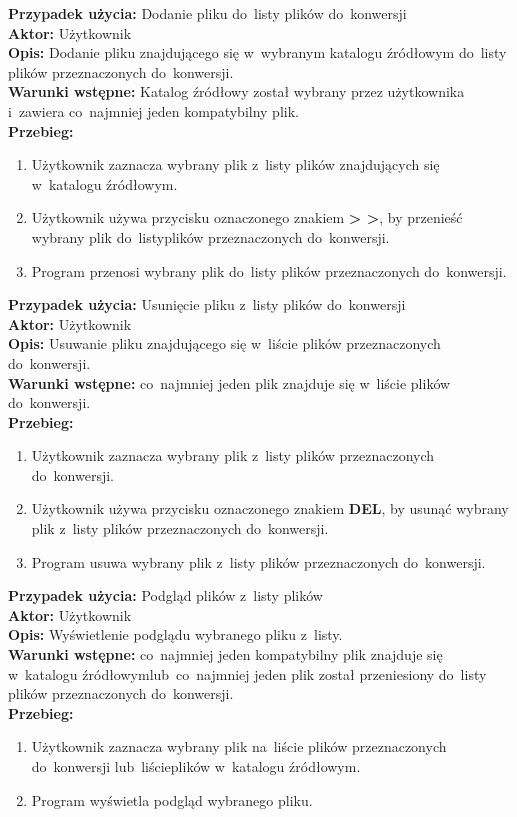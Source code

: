 \noindent \textbf{Przypadek użycia:} Dodanie pliku do~listy plików do~konwersji\\
\textbf{Aktor:} Użytkownik\\
\textbf{Opis:} Dodanie pliku znajdującego się w~wybranym katalogu źródłowym do~listy plików przeznaczonych do~konwersji.\\
\textbf{Warunki wstępne:} Katalog źródłowy został wybrany przez użytkownika i~zawiera co~najmniej jeden kompatybilny plik.\\
\textbf{Przebieg:}
\begin{enumerate}
\item Użytkownik zaznacza wybrany plik z~listy plików znajdujących się w~katalogu źródłowym.
\item Użytkownik używa przycisku oznaczonego znakiem \textbf{> >}, by przenieść wybrany plik do~listy\linebreak plików przeznaczonych do~konwersji.
\item Program przenosi wybrany plik do~listy plików przeznaczonych do~konwersji.
\end{enumerate}


\noindent \textbf{Przypadek użycia:} Usunięcie pliku z~listy plików do~konwersji\\
\textbf{Aktor:} Użytkownik\\
\textbf{Opis:} Usuwanie pliku znajdującego się w~liście plików przeznaczonych do~konwersji.\\
\textbf{Warunki wstępne:} co~najmniej jeden plik znajduje się w~liście plików do~konwersji.\\
\textbf{Przebieg:}
\begin{enumerate}
	\item Użytkownik zaznacza wybrany plik z~listy plików przeznaczonych do~konwersji.
	\item Użytkownik używa przycisku oznaczonego znakiem \textbf{DEL}, by usunąć wybrany plik z~listy plików przeznaczonych do~konwersji.
	\item Program usuwa wybrany plik z~listy plików przeznaczonych do~konwersji.
\end{enumerate}


\noindent \textbf{Przypadek użycia:} Podgląd plików z~listy plików\\
\textbf{Aktor:} Użytkownik\\
\textbf{Opis:} Wyświetlenie podglądu wybranego pliku z~listy.\\
\textbf{Warunki wstępne:} co~najmniej jeden kompatybilny plik znajduje się w~katalogu źródłowym\linebreak lub~co~najmniej jeden plik został przeniesiony do~listy plików przeznaczonych do~konwersji.\\
\textbf{Przebieg:}
\begin{enumerate}
	\item Użytkownik zaznacza wybrany plik na~liście plików przeznaczonych do~konwersji lub~liście\linebreak plików w~katalogu źródłowym.
	\item Program wyświetla podgląd wybranego pliku.
\end{enumerate}



